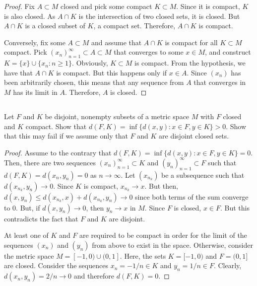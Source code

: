 \begin{proof}
Fix $A \subset M$ closed and pick some compact $K \subset M$. Since it is compact, $K$ is also closed. As $A \cap K$ is the intersection of two closed sets, it is closed. But $A \cap K$ is a closed subset of $K$, a compact set. Therefore, $A \cap K$ is compact.

\vspace{1em}

Conversely, fix some $A \subset M$ and assume that $A \cap K$ is compact for all $K \subset M$ compact. Pick $(x_n)_{n=1}^\infty \subset A \subset M$ that converges to some $x \in M$, and construct $K = \{x\} \cup \{x_n : n \geq 1\}$. Obviously, $K \subset M$ is compact. From the hypothesis, we have that $A \cap K$ is compact. But this happens only if $x \in A$. Since $(x_n)$ has been arbitrarily chosen, this means that any sequence from $A$ that converges in $M$ has its limit in $A$. Therefore, $A$ is closed.

\end{proof}



\subsection{} Let $F$ and $K$ be disjoint, nonempty subsets of a metric space $M$ with $F$ closed and $K$ compact. Show that $d(F, K) = \inf\{d(x , y) : x \in F, y \in K\} > 0$. Show that this may fail if we assume only that $F$ and $K$ are disjoint closed sets.

\begin{proof}
Assume to the contrary that $d(F, K) = \inf\{d(x , y) : x \in F, y \in K\} = 0$. Then, there are two sequences $(x_n)_{n=1}^\infty \subset K$ and $(y_n)_{n=1}^\infty \subset F$ such that $d(F, K) = d(x_n, y_n) = 0$ as $n \rightarrow \infty$. Let $(x_{n_k})$ be a subsequence such that $d(x_{n_k}, y_n) \rightarrow 0$. Since $K$ is compact, $x_{n_k} \rightarrow x$. But then, $d(x, y_n) \leq d(x_{n_k}, x) + d(x_{n_k}, y_n) \rightarrow 0$ since both terms of the sum converge to 0. But, if $d(x, y_n) \rightarrow 0$, then $y_n \rightarrow x$ in $M$. Since $F$ is closed, $x \in F$. But this contradicts the fact that $F$ and $K$ are disjoint.


\vspace{1em}

At least one of $K$ and $F$ are required to be compact in order for the limit of the sequences $(x_n)$ and $(y_n)$ from above to exist in the space. Otherwise, consider the metric space $M = [-1,0)\cup(0,1]$. Here, the sets $K = [-1,0)$ and $F = (0,1]$ are closed. Consider the sequences $x_n = -1/n \in K$ and $y_n = 1/n \in F$. Clearly, $d(x_n, y_n) = 2/n \rightarrow 0$ and therefore $d(F,K) = 0$.

\end{proof}

